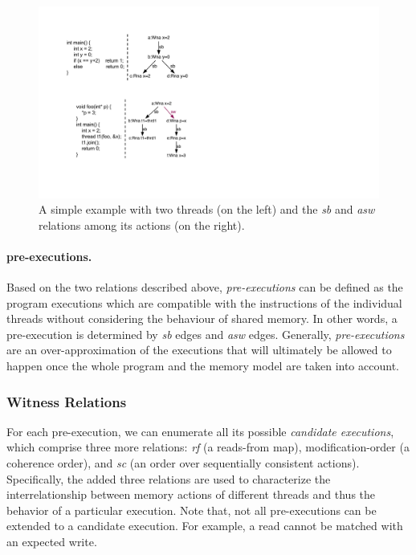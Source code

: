 \documentclass[preprint, numbers, 10pt]{sigplanconf}
\begin{document}
\begin{figure}%
\centering\includegraphics[scale=0.5]{asw_Relation.pdf} %
\caption{A simple example with two threads (on the left) and the \textit{sb} 
and \textit{asw} relations among its actions (on the right).}
\label{fig:asw_relation}
\end{figure}

\paragraph{pre-executions.}
Based on the two relations described above, 
\textit{pre-executions} can be defined as the program
executions which are compatible with the instructions of the individual 
threads without considering the behaviour of shared memory. 
In other words, a pre-execution is determined by \textit{sb} edges
and \textit{asw} edges.
Generally, \textit{pre-executions} are an over-approximation of the executions 
that will ultimately be allowed to happen once the whole program and 
the memory model are taken into account.

\subsubsection{Witness Relations}
\label{sec:relation2}

For each pre-execution, we can enumerate all its possible
\textit{candidate executions}, which comprise three more
relations: \textit{rf} (a reads-from map), modification-order (a coherence order), 
and \textit{sc} (an order over sequentially consistent actions). Specifically,
the added three relations are used to characterize the 
interrelationship between memory actions of different threads and thus
the behavior of a particular execution. Note that, not all 
pre-executions can be extended to a candidate execution. 
For example, a read cannot be matched with an expected write.
\end{document}
